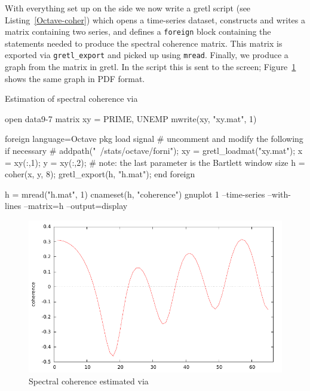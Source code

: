 With everything set up on the  side we now write a gretl
script (see Listing~\ref{Octave-coher}) which opens a time-series
dataset, constructs and writes a matrix containing two series, and
defines a \texttt{foreign} block containing the 
statements needed to produce the spectral coherence matrix. This
matrix is exported via \verb|gretl_export| and picked up using
\texttt{mread}. Finally, we produce a graph from the matrix in gretl.
In the script this is sent to the screen; Figure~\ref{fig:coherence}
shows the same graph in PDF format.

\begin{script}[htbp]
  \caption{Estimation of spectral coherence via }
  \label{Octave-coher}
\begin{scode}
open data9-7
matrix xy = { PRIME, UNEMP }
mwrite(xy, "xy.mat", 1)

foreign language=Octave
 pkg load signal
 # uncomment and modify the following if necessary
 # addpath("~/stats/octave/forni");
 xy = gretl_loadmat("xy.mat");
 x = xy(:,1);
 y = xy(:,2);
 # note: the last parameter is the Bartlett window size
 h = coher(x, y, 8);
 gretl_export(h, "h.mat");
end foreign

h = mread("h.mat", 1)
cnameset(h, "coherence")
gnuplot 1 --time-series --with-lines --matrix=h --output=display
\end{scode}
\scriptURL
\end{script}

\begin{figure}[htbp]
  \centering
  \includegraphics{figures/coherence}
  \caption{Spectral coherence estimated via }
  \label{fig:coherence}
\end{figure}


